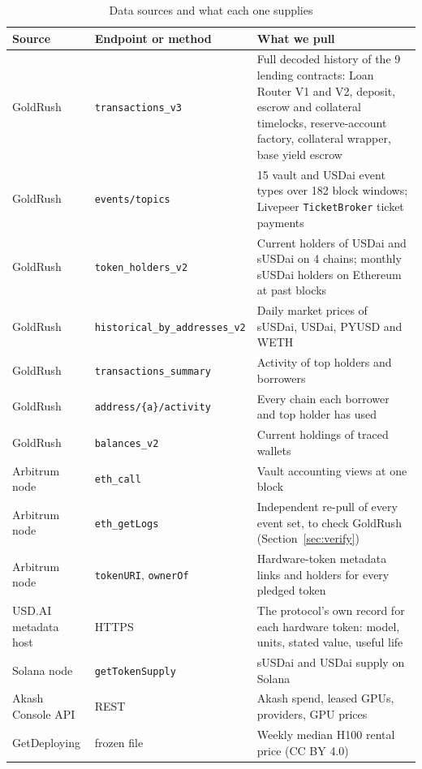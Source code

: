 \begin{table}[t]
\caption{Data sources and what each one supplies}
\label{tab:data}
\centering
\small
\renewcommand{\arraystretch}{1.25}
\begin{tabular}{@{}l l p{9.2cm}@{}}
\toprule
\textbf{Source} & \textbf{Endpoint or method} & \textbf{What we pull} \\
\midrule
GoldRush & \texttt{transactions\_v3} & Full decoded history of the 9 lending contracts: Loan Router V1 and V2, deposit, escrow and collateral timelocks, reserve-account factory, collateral wrapper, base yield escrow \\
GoldRush & \texttt{events/topics} & 15 vault and USDai event types over 182 block windows; Livepeer \texttt{TicketBroker} ticket payments \\
GoldRush & \texttt{token\_holders\_v2} & Current holders of USDai and sUSDai on 4 chains; monthly sUSDai holders on Ethereum at past blocks \\
GoldRush & \texttt{historical\_by\_addresses\_v2} & Daily market prices of sUSDai, USDai, PYUSD and WETH \\
GoldRush & \texttt{transactions\_summary} & Activity of top holders and borrowers \\
GoldRush & \texttt{address/\{a\}/activity} & Every chain each borrower and top holder has used \\
GoldRush & \texttt{balances\_v2} & Current holdings of traced wallets \\
\midrule
Arbitrum node & \texttt{eth\_call} & Vault accounting views at one block \\
Arbitrum node & \texttt{eth\_getLogs} & Independent re-pull of every event set, to check GoldRush (Section~\ref{sec:verify}) \\
Arbitrum node & \texttt{tokenURI}, \texttt{ownerOf} & Hardware-token metadata links and holders for every pledged token \\
USD.AI metadata host & HTTPS & The protocol's own record for each hardware token: model, units, stated value, useful life \\
Solana node & \texttt{getTokenSupply} & sUSDai and USDai supply on Solana \\
Akash Console API & REST & Akash spend, leased GPUs, providers, GPU prices \\
GetDeploying & frozen file & Weekly median H100 rental price (CC BY 4.0) \\
\bottomrule
\end{tabular}
\end{table}

